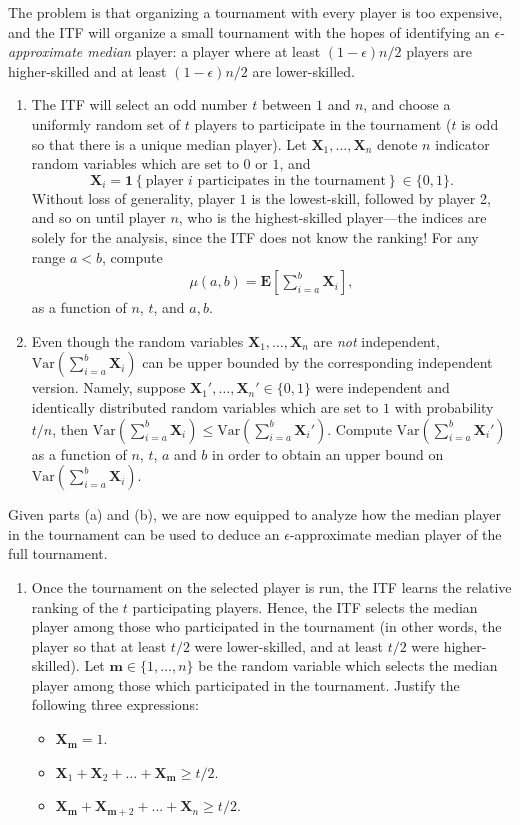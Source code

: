 \documentclass[twoside,11pt]{article}
\newcommand{\E}[1]{{\mathbf{E}\mathopen{}\left[ #1 \right]\mathclose{}}}
\newcommand{\Var}[1]{{\mathrm{Var}\mathopen{}\left( #1 \right)\mathclose{}}}
\newcommand{\ind}{\boldsymbol{1}}
\newcommand{\bm}{\boldsymbol{m}}
\newcommand{\bX}{\boldsymbol{X}}
\begin{document}
\begin{enumerate}
The problem is that organizing a tournament with every player is too expensive, and the ITF will organize a small tournament with the hopes of identifying an $\epsilon$-\emph{approximate median} player: a player where at least $(1-\epsilon)n/2$ players are higher-skilled and at least $(1-\epsilon) n/2$ are lower-skilled.

\begin{enumerate}
\item[(a)] The ITF will select an odd number $t$ between $1$ and $n$, and choose a uniformly random set of $t$ players to participate in the tournament ($t$ is odd so that there is a unique median player). Let $\bX_1,\dots, \bX_n$ denote $n$ indicator random variables which are set to $0$ or $1$, and 
\[ \bX_i = \ind\left\{ \text{player $i$ participates in the tournament}\right\} \in \{0,1\}.\]
Without loss of generality, player $1$ is the lowest-skill, followed by player 2, and so on until player $n$, who is the highest-skilled player---the indices are solely for the analysis, since the ITF does not know the ranking! For any range $a < b$, compute
\begin{align*}
\mu(a, b) = \E{\sum_{i=a}^b \bX_i},
\end{align*}
as a function of $n$, $t$, and $a,b$. 

\item[(b)] Even though the random variables $\bX_1,\dots, \bX_n$ are \emph{not} independent, $\Var{\sum_{i=a}^b \bX_i}$ can be upper bounded by the corresponding independent version. Namely, suppose $\bX_1', \dots, \bX_n' \in \{0,1\}$ were independent and identically distributed random variables which are set to $1$ with probability $t/n$, then $\Var{\sum_{i=a}^b \bX_i} \leq \Var{\sum_{i=a}^b \bX_i'}$. Compute $\Var{ \sum_{i=a}^b \bX_i' }$ as a function of $n$, $t$, $a$ and $b$ in order to obtain an upper bound on $\Var{\sum_{i=a}^b \bX_i}$.

\end{enumerate}
Given parts (a) and (b), we are now equipped to analyze how the median player in the tournament can be used to deduce an $\epsilon$-approximate median player of the full tournament.
\begin{enumerate}
\item[(c)] Once the tournament on the selected player is run, the ITF learns the relative ranking of the $t$ participating players. Hence, the ITF selects the median player among those who participated in the tournament (in other words, the player so that at least $t/2$ were lower-skilled, and at least $t/2$ were higher-skilled). Let $\bm \in \{1,\dots, n\}$ be the random variable which selects the median player among those which participated in the tournament. Justify the following three expressions:
\begin{itemize}
\item $\bX_{\bm} = 1$.
\item $\bX_1 + \bX_2 + \dots + \bX_{\bm} \geq t / 2$.
\item $\bX_{\bm} + \bX_{\bm+2} + \dots + \bX_n \geq t / 2$.
\end{itemize}


\end{enumerate}
\end{enumerate}
\end{document}
